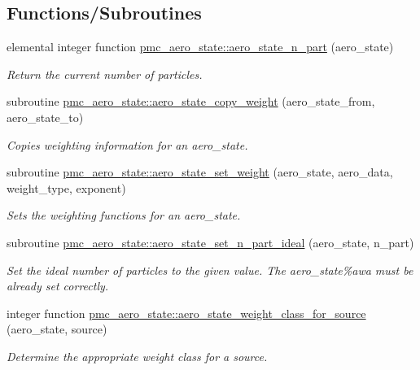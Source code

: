 \subsection*{Functions/\+Subroutines}
\begin{DoxyCompactItemize}
\item 
elemental integer function \mbox{\hyperlink{namespacepmc__aero__state_a94155bf7fa94e7c3ab722a5a1dacac98}{pmc\+\_\+aero\+\_\+state\+::aero\+\_\+state\+\_\+n\+\_\+part}} (aero\+\_\+state)
\begin{DoxyCompactList}\small\item\em Return the current number of particles. \end{DoxyCompactList}\item 
subroutine \mbox{\hyperlink{namespacepmc__aero__state_ade0790e3c1fbf87ed303a8ab22de32e3}{pmc\+\_\+aero\+\_\+state\+::aero\+\_\+state\+\_\+copy\+\_\+weight}} (aero\+\_\+state\+\_\+from, aero\+\_\+state\+\_\+to)
\begin{DoxyCompactList}\small\item\em Copies weighting information for an {\ttfamily aero\+\_\+state}. \end{DoxyCompactList}\item 
subroutine \mbox{\hyperlink{namespacepmc__aero__state_ae949175272a73f61c851a2ac4a58c712}{pmc\+\_\+aero\+\_\+state\+::aero\+\_\+state\+\_\+set\+\_\+weight}} (aero\+\_\+state, aero\+\_\+data, weight\+\_\+type, exponent)
\begin{DoxyCompactList}\small\item\em Sets the weighting functions for an {\ttfamily aero\+\_\+state}. \end{DoxyCompactList}\item 
subroutine \mbox{\hyperlink{namespacepmc__aero__state_a82d688a836cb8ed88c46dd010247d3c1}{pmc\+\_\+aero\+\_\+state\+::aero\+\_\+state\+\_\+set\+\_\+n\+\_\+part\+\_\+ideal}} (aero\+\_\+state, n\+\_\+part)
\begin{DoxyCompactList}\small\item\em Set the ideal number of particles to the given value. The {\ttfamily aero\+\_\+state\%awa} must be already set correctly. \end{DoxyCompactList}\item 
integer function \mbox{\hyperlink{namespacepmc__aero__state_a070d20781c622419c7823654680595b4}{pmc\+\_\+aero\+\_\+state\+::aero\+\_\+state\+\_\+weight\+\_\+class\+\_\+for\+\_\+source}} (aero\+\_\+state, source)
\begin{DoxyCompactList}\small\item\em Determine the appropriate weight class for a source. \end{DoxyCompactList}\item 

\end{DoxyCompactItemize}
